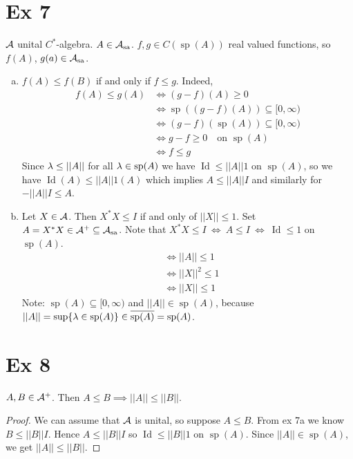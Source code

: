 \documentclass[10pt,english,a4paper]{article}
\theoremstyle{definition}
\def\Assa{\As_{\text{sa}}}
\DeclareMathOperator{\Id}{Id}
\DeclareMathOperator{\Sp}{sp}
\begin{document}
\section*{Ex 7}
$\mathcal{A}$ unital $C^*$-algebra. $A \in \Assa$. $f,g \in C(\Sp(A))$ real valued functions,
so $f(A)$, $g(a) \in \Assa$.

\begin{enumerate}[(a)]
    \item 
$f(A) \leq f(B)$ if and only if $f \leq g$.
Indeed, 
\begin{align*}
    f(A) \leq g(A) &\iff (g-f)(A)\geq 0 \\
    &\iff \Sp((g-f)(A)) \subseteq [0,\infty) \\
    &\iff (g-f)(\Sp(A)) \subseteq [0,\infty) \\
    &\iff g-f \geq 0 \quad \text{on }\Sp(A) \\
    &\iff f \leq g
\end{align*}
Since $\lambda \leq ||A||$ for all $\la \in \Sp(A)$ we have $\Id \leq ||A||1$ on $\Sp(A)$,
so we have 
$\Id(A) \leq ||A|| 1(A) $ which implies $A \leq ||A|| I$ and similarly for
$-||A|| I \leq A$.

\item Let $X \in \mathcal{A}$. Then $X^*X \leq I$ if and only of $||X||\leq 1$. Set 
$A = X^*X \in \As^+ \subseteq \Assa$. Note that 
$X^*X \leq I ~\iff ~ A \leq I ~ \iff ~ \Id \leq 1$ on $\Sp(A)$.
\begin{align*}
    &\iff ||A|| \leq 1 \\
    &\iff ||X||^2 \leq 1 \\
    &\iff ||X|| \leq 1
\end{align*}
Note: $\Sp(A) \subseteq [0,\infty)$ and $||A|| \in \Sp(A)$, because 
$||A|| = \sup\{ \la \in \Sp(A) \} \in \ol{\Sp(A)} = \Sp(A)$.

\end{enumerate}

\section*{Ex 8}
$A,B \in \mathcal{A}^+$. Then $A \leq B \implies ||A||\leq ||B||$.
\begin{proof}
    We can assume that $\mathcal{A}$ is unital, so suppose $A \leq B$.
    From ex 7a we know $B \leq ||B|| I$. Hence $A\leq ||B||I$ so 
    $\Id \leq ||B|| 1$ on $\Sp(A)$. Since $||A|| \in \Sp(A)$, we get $||A||
    \leq ||B||$. 
\end{proof}
\end{document}
